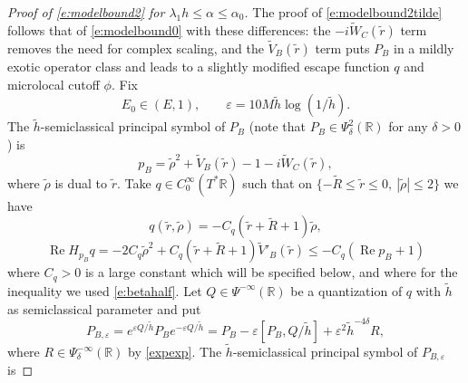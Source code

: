 \documentclass[reqno, 12pt]{amsart}
\newcommand \R {\mathbb{R}}
\newcommand \eps {\varepsilon}
\DeclareMathOperator \re {Re}
\theoremstyle{definition}
\numberwithin{equation}{section}
\numberwithin{prop}{section}
\numberwithin{figure}{section}
\begin{document}
\begin{proof}[Proof of \eqref{e:modelbound2} for $\lambda_1 h \le \alpha \le \alpha_0$]
The proof of \eqref{e:modelbound2tilde} follows  that of \eqref{e:modelbound0} with these differences: the $-i\widetilde W_C(\tilde r)$ term removes the need for complex scaling, and the $\widetilde V_B(\tilde r)$ term  puts $P_B$ in a mildly exotic operator class and leads to a slightly modified escape function $q$ and microlocal cutoff $\phi$. Fix
\begin{equation}\label{e:e0cusp}
E_0 \in (E,1), \qquad \eps = 10M\tilde h \log(1/\tilde h).
\end{equation}
The $\tilde h$-semiclassical principal symbol of $P_B$ (note that $P_B \in \Psi^2_\delta(\R)$ for any $\delta>0$) is
\begin{equation}\label{e:pcsymb}
p_B = \tilde \rho^2 + \widetilde V_B(\tilde r) - 1 - i \widetilde W_C(\tilde r),
\end{equation}
where $\tilde \rho$ is dual  to $\tilde r$. Take $q \in C_0^\infty(T^*\R)$ such that on $\{-\widetilde R \le \tilde r \le 0, \ |\tilde \rho| \le 2\}$ we have
\[
q(\tilde r, \tilde \rho) = - C_q (\tilde r + \widetilde R+1) \tilde \rho, 
\]
\[
\re H_{p_B}q = -2C_q \tilde \rho^2 + C_q(\tilde r  + \widetilde R+1) \widetilde V'_B(\tilde r) \le -C_q (\re p_B + 1)
\]
where $C_q>0$ is a large constant which will be specified below, and where for the inequality we used \eqref{e:betahalf}.
Let $Q \in \Psi^{-\infty}(\R)$ be a quantization of $q$ with $\tilde h$ as semiclassical parameter and put
\begin{equation}\label{e:expexp}
P_{B,\eps} = e^{\eps Q/\tilde h} P_B e^{-\eps Q/ \tilde h} = P_B - \eps[P_B,Q/\tilde h] + \eps^2 \tilde h^{-4\delta} R,
\end{equation}
where $R \in \Psi_\delta^{-\infty}(\R)$ by \eqref{expexp}. The $\tilde h$-semiclassical principal symbol of $P_{B,\eps}$ is

\end{proof}
\end{document}
